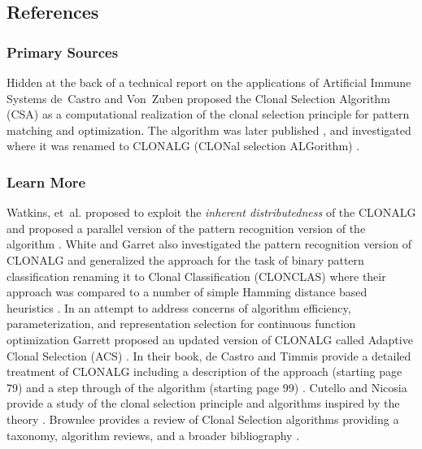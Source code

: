 


\subsection{References}

% 
% 
\subsubsection{Primary Sources}
Hidden at the back of a technical report on the applications of Artificial Immune Systems de~Castro and Von~Zuben \cite{Castro1999} proposed the Clonal Selection Algorithm (CSA) as a computational realization of the clonal selection principle for pattern matching and optimization.
The algorithm was later published \cite{Castro2000}, and investigated where it was renamed to CLONALG (CLONal selection ALGorithm) \cite{Castro2002a}.

% 
% 
\subsubsection{Learn More}
Watkins, et~al. proposed to exploit the \emph{inherent distributedness} of the CLONALG and proposed a parallel version of the pattern recognition version of the algorithm \cite{Watkins2003}.
White and Garret also investigated the pattern recognition version of CLONALG and generalized the approach for the task of binary pattern classification renaming it to Clonal Classification (CLONCLAS) where their approach was compared to a number of simple Hamming distance based heuristics \cite{White2003}.
In an attempt to address concerns of algorithm efficiency, parameterization, and representation selection for continuous function optimization Garrett proposed an updated version of CLONALG called Adaptive Clonal Selection (ACS) \cite{Garrett2004}.
In their book, de Castro and Timmis provide a detailed treatment of CLONALG including a description of the approach (starting page 79) and a step through of the algorithm (starting page 99) \cite{Castro2002b}.
Cutello and Nicosia provide a study of the clonal selection principle and algorithms inspired by the theory \cite{Cutello2005}.
Brownlee provides a review of Clonal Selection algorithms providing a taxonomy, algorithm reviews, and a broader bibliography \cite{Brownlee2007b}.
